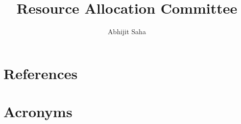 \documentclass[OPS,authoryear,toc]{lsstdoc}
\title{Resource Allocation Committee}
\author{%
Abhijit Saha
}
\date{\vcsDate}
\begin{document}

\mkshorttitle



\appendix

\section{References} \label{sec:bib}
\renewcommand{\refname}{} %


\section{Acronyms} \label{sec:acronyms}

\end{document}
